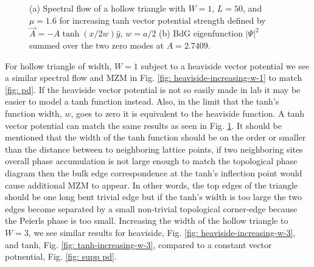\begin{figure}[!ht]
  \caption{(a) Spectral flow of a hollow triangle with $W=1$, $L=50$, and $\mu=1.6$ for increasing tanh vector potential strength defined by $\vec{A} = -A \tanh(x/2w)\hat{y}$, $w=a/2$ (b) BdG eigenfunction $|\Psi|^2$ summed over the two zero modes at $A = 2.7409$.}
  \label{fig: tanh-increasing-w-1}
\end{figure}

For hollow triangle of width, $W=1$ subject to a heaviside vector potential we see a similar spectral flow and MZM in Fig. \ref{fig: heaviside-increasing-w-1} to match \ref{fig: pd}.
If the heaviside vector potential is not so easily made in lab it may be easier to model a tanh function instead.
Also, in the limit that the tanh's function width, $w$, goes to zero it is equivalent to the heaviside function.
A tanh vector potential can match the same results as seen in Fig. \ref{fig: tanh-increasing-w-1}.
It should be mentioned that the width of the tanh function should be on the order or smaller than the distance between to neighboring lattice points, if two neighboring sites overall phase accumulation is not large enough to match the topological phase diagram then the bulk edge correspondence at the tanh's inflection point would cause additional MZM to appear.
In other words, the top edges of the triangle should be one long bent trivial edge but if the tanh's width is too large the two edges become separated by a small non-trivial topological corner-edge because the Peierls phase is too small.
Increasing the width of the hollow triangle to $W=3$, we see similar results for heaviside, Fig. \ref{fig: heaviside-increasing-w-3}, and tanh, Fig. \ref{fig: tanh-increasing-w-3}, compared to a constant vector potnential, Fig. \ref{fig: supp pd}.


